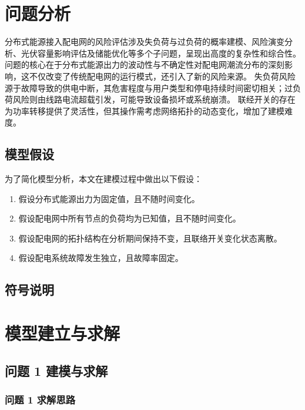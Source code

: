 \documentclass{article}
\begin{document}
\section{问题分析}\label{sec:analysis}

分布式能源接入配电网的风险评估涉及失负荷与过负荷的概率建模、风险演变分析、光伏容量影响评估及储能优化等多个子问题，呈现出高度的复杂性和综合性。
问题的核心在于分布式能源出力的波动性与不确定性对配电网潮流分布的深刻影响，这不仅改变了传统配电网的运行模式，还引入了新的风险来源。
失负荷风险源于故障导致的供电中断，其危害程度与用户类型和停电持续时间密切相关；过负荷风险则由线路电流超载引发，可能导致设备损坏或系统崩溃。
联经开关的存在为功率转移提供了灵活性，但其操作需考虑网络拓扑的动态变化，增加了建模难度。

\subsection{模型假设}\label{subsec:assumption}

为了简化模型分析，本文在建模过程中做出以下假设：

\begin{enumerate}
  \item 假设分布式能源出力为固定值，且不随时间变化。\label{assumption:fixed_output}
  \item 假设配电网中所有节点的负荷均为已知值，且不随时间变化。\label{assumption:fixed_load}
  \item 假设配电网的拓扑结构在分析期间保持不变，且联络开关变化状态离散。\label{assumption:topology_fixed}
  \item 假设配电系统故障发生独立，且故障率固定。\label{assumption:independent_failure}
\end{enumerate}

\subsection{符号说明}\label{subsec:notation}

\section{模型建立与求解}\label{sec:model}

\subsection{问题 1 建模与求解}\label{subsec:problem1}

\subsubsection{问题 1 求解思路}\label{subsubsec:problem1_idea}
\end{document}

